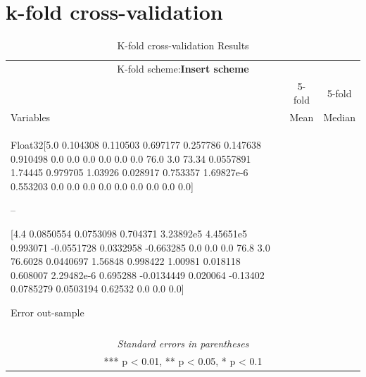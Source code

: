 \documentclass{article}
\begin{document}

\section{k-fold cross-validation}

\begin{table}[!h]
  \centering
  \caption{K-fold cross-validation Results}
    \begin{tabular}{l c c}
    \hline
    \multicolumn{3}{c}{K-fold scheme:\textbf{Insert scheme}}    \\
                    & 5-fold         & 5-fold \\
    Variables       & Mean                    & Median          \\
    \hline
    \hline
Float32[5.0 0.104308 0.110503 0.697177 0.257786 0.147638 0.910498 0.0 0.0 0.0 0.0 0.0 0.0 76.0 3.0 73.34 0.0557891 1.74445 0.979705 1.03926 0.028917 0.753357 1.69827e-6 0.553203 0.0 0.0 0.0 0.0 0.0 0.0 0.0 0.0 0.0]

--


[4.4 0.0850554 0.0753098 0.704371 3.23892e5 4.45651e5 0.993071 -0.0551728 0.0332958 -0.663285 0.0 0.0 0.0 76.8 3.0 76.6028 0.0440697 1.56848 0.998422 1.00981 0.018118 0.608007 2.29482e-6 0.695288 -0.0134449 0.020064 -0.13402 0.0785279 0.0503194 0.62532 0.0 0.0 0.0]

    \hline

    Error out-sample &     &   \\
                     &     &   \\
    \hline
    \hline
    \multicolumn{3}{c}{\textit{Standard errors in parentheses}} \\
    \multicolumn{3}{c}{*** p < 0.01, ** p < 0.05, * p < 0.1} \\
    \hline
    \end{tabular}
  \label{tab:addlabel}
\end{table}
\end{document}

